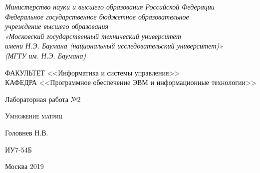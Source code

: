 \documentclass[a4paper,12pt]{article}
\begin{document}

\begin{titlepage}
\newpage

\begin{center}

\textit{Министерство науки и высшего образования Российской Федерации \\ 
Федеральное государственное бюджетное образовательное \\
учреждение высшего образования \\
«Московский государственный технический университет \\
имени Н.Э. Баумана (национальный исследовательский университет)» \\
(МГТУ им. Н.Э. Баумана) \\}
\hrulefill
\end{center}

\vspace{2em}

\begin{flushleft}
ФАКУЛЬТЕТ <<Информатика и системы управления>> \\
\vspace{0.5em}
КАФЕДРА <<Программное обеспечение ЭВМ и информационные технологии>>
\end{flushleft}


\vspace{8em}

\begin{center}
\LARGE Лабораторная работа №2 \\
\end{center}

\vspace{1.5em}

\begin{center}
\textsc{Умножение матриц}
\end{center}

\vspace{6em}

\begin{center}
Головнев Н.В.

\vspace{4em}

ИУ7-54Б
\end{center}

\vspace{\fill}

\begin{center}
Москва 2019
\end{center}

\end{titlepage}
\end{document}
